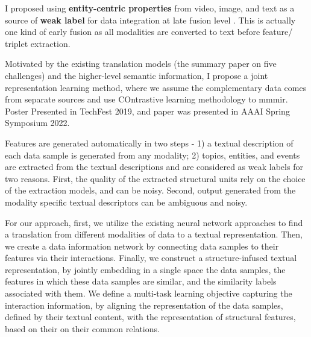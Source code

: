 {}
%
%
I proposed using \textbf{entity-centric properties} from video, image, and text as a source of \textbf{weak label} for data integration at late fusion level \cite{solaiman2022open}. %
This is actually one kind of early fusion as all modalities are converted to text before feature/ triplet extraction.

Motivated by the existing translation models (the summary paper on five challenges) and the higher-level semantic information, I propose a joint representation learning method, where we assume the complementary data comes from separate sources and use COntrastive learning methodology to mmmir. Poster Presented in TechFest 2019, and paper was presented in AAAI Spring Symposium 2022.

Features are
generated automatically in two steps - 1) a textual description of each data sample is generated from any modality; 2)
topics, entities, and events are extracted from the textual descriptions and are considered as weak labels for two reasons.
First, the quality of the extracted structural units rely on the
choice of the extraction models, and can be noisy. Second,
output generated from the modality specific textual descriptors can be ambiguous and noisy.

For our approach, first, we utilize the existing neural network approaches to find a translation from different modalities of data to a textual representation. Then, we create a data information network by connecting data samples to
their features via their interactions.
Finally, we construct a
structure-infused textual representation, by jointly embedding in a single space the data samples, the features in which
these data samples are similar, and the similarity labels associated with them. We define a multi-task learning objective capturing the interaction information, by aligning the
representation of the data samples, defined by their textual
content, with the representation of structural features, based
on their on their common relations. 


